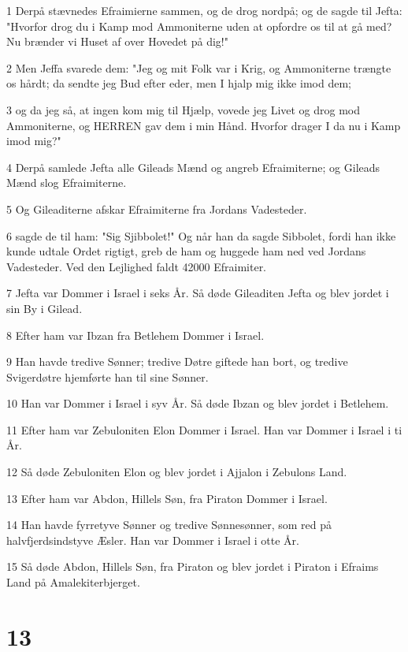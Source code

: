 \par 1 Derpå stævnedes Efraimierne sammen, og de drog nordpå; og de sagde til Jefta: "Hvorfor drog du i Kamp mod Ammoniterne uden at opfordre os til at gå med? Nu brænder vi Huset af over Hovedet på dig!"
\par 2 Men Jeffa svarede dem: "Jeg og mit Folk var i Krig, og Ammoniterne trængte os hårdt; da sendte jeg Bud efter eder, men I hjalp mig ikke imod dem;
\par 3 og da jeg så, at ingen kom mig til Hjælp, vovede jeg Livet og drog mod Ammoniterne, og HERREN gav dem i min Hånd. Hvorfor drager I da nu i Kamp imod mig?"
\par 4 Derpå samlede Jefta alle Gileads Mænd og angreb Efraimiterne; og Gileads Mænd slog Efraimiterne.
\par 5 Og Gileaditerne afskar Efraimiterne fra Jordans Vadesteder.
\par 6 sagde de til ham: "Sig Sjibbolet!" Og når han da sagde Sibbolet, fordi han ikke kunde udtale Ordet rigtigt, greb de ham og huggede ham ned ved Jordans Vadesteder. Ved den Lejlighed faldt 42000 Efraimiter.
\par 7 Jefta var Dommer i Israel i seks År. Så døde Gileaditen Jefta og blev jordet i sin By i Gilead.
\par 8 Efter ham var Ibzan fra Betlehem Dommer i Israel.
\par 9 Han havde tredive Sønner; tredive Døtre giftede han bort, og tredive Svigerdøtre hjemførte han til sine Sønner.
\par 10 Han var Dommer i Israel i syv År. Så døde Ibzan og blev jordet i Betlehem.
\par 11 Efter ham var Zebuloniten Elon Dommer i Israel. Han var Dommer i Israel i ti År.
\par 12 Så døde Zebuloniten Elon og blev jordet i Ajjalon i Zebulons Land.
\par 13 Efter ham var Abdon, Hillels Søn, fra Piraton Dommer i Israel.
\par 14 Han havde fyrretyve Sønner og tredive Sønnesønner, som red på halvfjerdsindstyve Æsler. Han var Dommer i Israel i otte År.
\par 15 Så døde Abdon, Hillels Søn, fra Piraton og blev jordet i Piraton i Efraims Land på Amalekiterbjerget.

\chapter{13}


